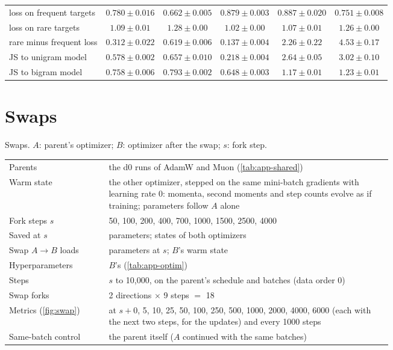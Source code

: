 \begin{center}
\begin{minipage}{\linewidth}
\begin{tabular}{@{}l|ccc|cc@{}}
loss on frequent targets & $0.780 \pm 0.016$ & $0.662 \pm 0.005$ & $0.879 \pm 0.003$ & $0.887 \pm 0.020$ & $0.751 \pm 0.008$ \\
loss on rare targets & $1.09 \pm 0.01$ & $1.28 \pm 0.00$ & $1.02 \pm 0.00$ & $1.07 \pm 0.01$ & $1.26 \pm 0.00$ \\
rare minus frequent loss & $0.312 \pm 0.022$ & $0.619 \pm 0.006$ & $0.137 \pm 0.004$ & $2.26 \pm 0.22$ & $4.53 \pm 0.17$ \\
JS to unigram model & $0.578 \pm 0.002$ & $0.657 \pm 0.010$ & $0.218 \pm 0.004$ & $2.64 \pm 0.05$ & $3.02 \pm 0.10$ \\
JS to bigram model & $0.758 \pm 0.006$ & $0.793 \pm 0.002$ & $0.648 \pm 0.003$ & $1.17 \pm 0.01$ & $1.23 \pm 0.01$ \\
\end{tabular}\end{minipage}
\end{center}

\section{Swaps}
\label{app:forks}

\begin{center}\small\begin{minipage}{\linewidth}\centering
\captionsetup{type=table}
\caption{Swaps. $A$: parent's optimizer; $B$: optimizer after the swap; $s$: fork step.}
\label{tab:app-forks}
\begin{tabular}{@{}lp{0.74\linewidth}@{}}
\hline
Parents & the d0 runs of AdamW and Muon (\cref{tab:app-shared}) \\
Warm state & the other optimizer, stepped on the same mini-batch gradients with learning rate 0: momenta, second
  moments and step counts evolve as if training; parameters follow $A$ alone \\
Fork steps $s$ & 50, 100, 200, 400, 700, 1000, 1500, 2500, 4000 \\
Saved at $s$ & parameters; states of both optimizers \\
\hline
Swap $A\to B$ loads & parameters at $s$; $B$'s warm state \\
Hyperparameters & $B$'s (\cref{tab:app-optim}) \\
Steps & $s$ to 10{,}000, on the parent's schedule and batches (data order 0) \\
Swap forks & 2 directions $\times$ 9 steps $=$ 18 \\
Metrics (\cref{fig:swap}) & at $s+{}$0, 5, 10, 25, 50, 100, 250, 500, 1000, 2000, 4000, 6000 (each with the next
  two steps, for the updates) and every 1000 steps \\
\hline
Same-batch control & the parent itself ($A$ continued with the same batches) \\
\hline
\end{tabular}\end{minipage}
\end{center}
